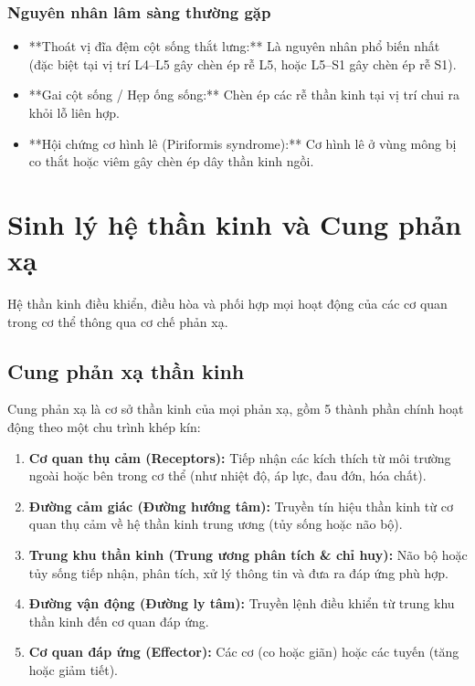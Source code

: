 \subsubsection{Nguyên nhân lâm sàng thường gặp}
\begin{itemize}
    \item **Thoát vị đĩa đệm cột sống thắt lưng:** Là nguyên nhân phổ biến nhất (đặc biệt tại vị trí L4--L5 gây chèn ép rễ L5, hoặc L5--S1 gây chèn ép rễ S1).
    \item **Gai cột sống / Hẹp ống sống:** Chèn ép các rễ thần kinh tại vị trí chui ra khỏi lỗ liên hợp.
    \item **Hội chứng cơ hình lê (Piriformis syndrome):** Cơ hình lê ở vùng mông bị co thắt hoặc viêm gây chèn ép dây thần kinh ngồi.
\end{itemize}

\section{Sinh lý hệ thần kinh và Cung phản xạ}

Hệ thần kinh điều khiển, điều hòa và phối hợp mọi hoạt động của các cơ quan trong cơ thể thông qua cơ chế phản xạ.

\subsection{Cung phản xạ thần kinh}

Cung phản xạ là cơ sở thần kinh của mọi phản xạ, gồm 5 thành phần chính hoạt động theo một chu trình khép kín:

\begin{enumerate}
    \item \textbf{Cơ quan thụ cảm (Receptors):} Tiếp nhận các kích thích từ môi trường ngoài hoặc bên trong cơ thể (như nhiệt độ, áp lực, đau đớn, hóa chất).
    \item \textbf{Đường cảm giác (Đường hướng tâm):} Truyền tín hiệu thần kinh từ cơ quan thụ cảm về hệ thần kinh trung ương (tủy sống hoặc não bộ).
    \item \textbf{Trung khu thần kinh (Trung ương phân tích \& chỉ huy):} Não bộ hoặc tủy sống tiếp nhận, phân tích, xử lý thông tin và đưa ra đáp ứng phù hợp.
    \item \textbf{Đường vận động (Đường ly tâm):} Truyền lệnh điều khiển từ trung khu thần kinh đến cơ quan đáp ứng.
    \item \textbf{Cơ quan đáp ứng (Effector):} Các cơ (co hoặc giãn) hoặc các tuyến (tăng hoặc giảm tiết).
\end{enumerate}

